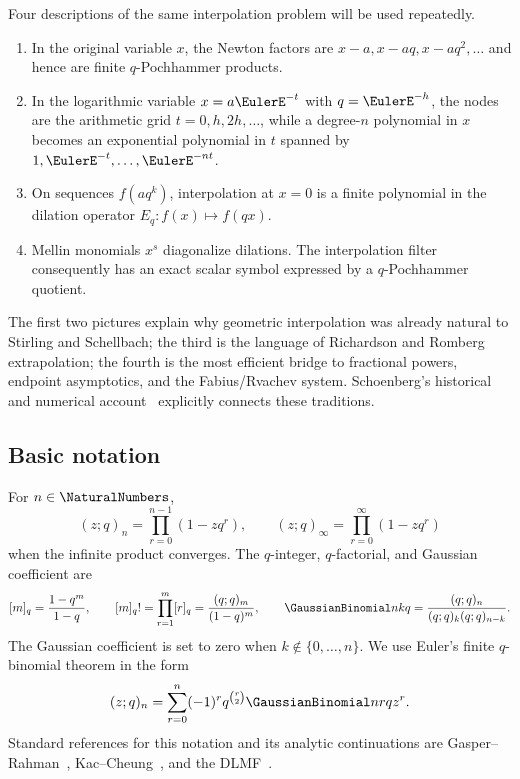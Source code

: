 \documentclass[11pt,a4paper,oneside]{article}
\theoremstyle{definition}
\theoremstyle{remark}
\begin{document}
Four descriptions of the same interpolation problem will be used repeatedly.

\begin{enumerate}
\item In the original variable $x$, the Newton factors are
      $x-a,x-aq,x-aq^2,\ldots$ and hence are finite $q$-Pochhammer products.
\item In the logarithmic variable $x=a\EulerE^{-t}$ with $q=\EulerE^{-h}$, the nodes are
      the arithmetic grid $t=0,h,2h,\ldots$, while a degree-$n$ polynomial in
      $x$ becomes an exponential polynomial in $t$ spanned by
      $1,\EulerE^{-t},\ldots,\EulerE^{-nt}$.
\item On sequences $f(aq^k)$, interpolation at $x=0$ is a finite polynomial in
      the dilation operator $E_q:f(x)\mapsto f(qx)$.
\item Mellin monomials $x^s$ diagonalize dilations.  The interpolation filter
      consequently has an exact scalar symbol expressed by a $q$-Pochhammer
      quotient.
\end{enumerate}

The first two pictures explain why geometric interpolation was already natural
to Stirling and Schellbach; the third is the language of Richardson and
Romberg extrapolation; the fourth is the most efficient bridge to fractional
powers, endpoint asymptotics, and the Fabius/Rvachev system.  Schoenberg's
historical and numerical account~\cite{Schoenberg1981} explicitly connects
these traditions.

\subsection{Basic notation}

For $n\in\NaturalNumbers$,
\[
 (z;q)_n=\prod_{r=0}^{n-1}(1-zq^r),
 \qquad
 (z;q)_\infty=\prod_{r=0}^{\infty}(1-zq^r)
\]
when the infinite product converges.  The $q$-integer, $q$-factorial, and
Gaussian coefficient are
\[
 [m]_q=\frac{1-q^m}{1-q},\qquad
 [m]_q!=\prod_{r=1}^m[r]_q=\frac{(q;q)_m}{(1-q)^m},
 \qquad
 \GaussianBinomial nkq=\frac{(q;q)_n}{(q;q)_k(q;q)_{n-k}}.
\]
The Gaussian coefficient is set to zero when $k\notin\{0,\ldots,n\}$.  We use
Euler's finite $q$-binomial theorem in the form
\begin{equation}
 (z;q)_n=\sum_{r=0}^n(-1)^rq^{\binom r2}\GaussianBinomial nrq z^r.
 \label{eq:finite-qbinomial}
\end{equation}
Standard references for this notation and its analytic continuations are
Gasper--Rahman~\cite{GasperRahman2004}, Kac--Cheung~\cite{KacCheung2002}, and
the DLMF~\cite{DLMF17}.
\end{document}
